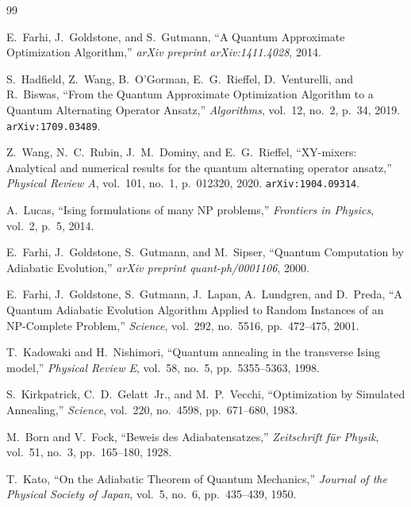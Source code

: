 \documentclass[11pt,a4paper,oneside,openany]{ltjsbook}
\theoremstyle{definition}
\theoremstyle{plain}
\theoremstyle{remark}
\begin{document}
\begin{thebibliography}{99}

E.~Farhi, J.~Goldstone, and S.~Gutmann,
\newblock ``A Quantum Approximate Optimization Algorithm,''
\newblock \textit{arXiv preprint arXiv:1411.4028}, 2014.

S.~Hadfield, Z.~Wang, B.~O'Gorman, E.~G.~Rieffel, D.~Venturelli, and R.~Biswas,
\newblock ``From the Quantum Approximate Optimization Algorithm to a Quantum Alternating Operator Ansatz,''
\newblock \textit{Algorithms}, vol.~12, no.~2, p.~34, 2019. \texttt{arXiv:1709.03489}.

Z.~Wang, N.~C.~Rubin, J.~M.~Dominy, and E.~G.~Rieffel,
\newblock ``XY-mixers: Analytical and numerical results for the quantum alternating operator ansatz,''
\newblock \textit{Physical Review A}, vol.~101, no.~1, p.~012320, 2020. \texttt{arXiv:1904.09314}.

A.~Lucas,
\newblock ``Ising formulations of many NP problems,''
\newblock \textit{Frontiers in Physics}, vol.~2, p.~5, 2014.

E.~Farhi, J.~Goldstone, S.~Gutmann, and M.~Sipser,
\newblock ``Quantum Computation by Adiabatic Evolution,''
\newblock \textit{arXiv preprint quant-ph/0001106}, 2000.

E.~Farhi, J.~Goldstone, S.~Gutmann, J.~Lapan, A.~Lundgren, and D.~Preda,
\newblock ``A Quantum Adiabatic Evolution Algorithm Applied to Random Instances of an NP-Complete Problem,''
\newblock \textit{Science}, vol.~292, no.~5516, pp.~472--475, 2001.

T.~Kadowaki and H.~Nishimori,
\newblock ``Quantum annealing in the transverse Ising model,''
\newblock \textit{Physical Review E}, vol.~58, no.~5, pp.~5355--5363, 1998.

S.~Kirkpatrick, C.~D.~Gelatt~Jr., and M.~P.~Vecchi,
\newblock ``Optimization by Simulated Annealing,''
\newblock \textit{Science}, vol.~220, no.~4598, pp.~671--680, 1983.

M.~Born and V.~Fock,
\newblock ``Beweis des Adiabatensatzes,''
\newblock \textit{Zeitschrift f{\"u}r Physik}, vol.~51, no.~3, pp.~165--180, 1928.

T.~Kato,
\newblock ``On the Adiabatic Theorem of Quantum Mechanics,''
\newblock \textit{Journal of the Physical Society of Japan}, vol.~5, no.~6, pp.~435--439, 1950.


\end{thebibliography}
\end{document}
